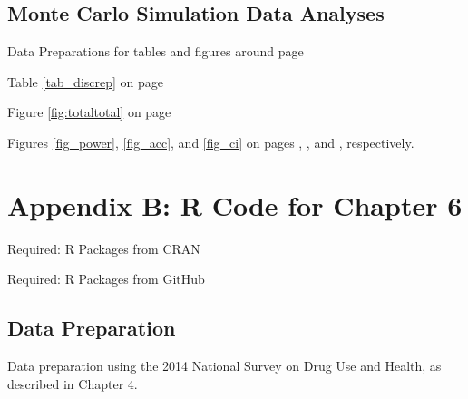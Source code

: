 \documentclass[]{DissertateUSU}
\begin{document}
\subsection*{Monte Carlo Simulation Data
Analyses}\label{monte-carlo-simulation-data-analyses}

Data Preparations for tables and figures around page
\pageref{tab_discrep}

\small

\normalsize

Table \ref{tab_discrep} on page \pageref{tab_discrep}

\small

\normalsize

Figure \ref{fig:totaltotal} on page \pageref{fig:totaltotal}

\small

\normalsize

Figures \ref{fig_power}, \ref{fig_acc}, and \ref{fig_ci} on pages
\pageref{fig_power}, \pageref{fig_acc}, and \pageref{fig_ci},
respectively.

\small

\normalsize

\clearpage

\doublespacing

\section*{Appendix B: R Code for Chapter
6}\label{appendix-b-r-code-for-chapter-6}

\singlespace

Required: R Packages from CRAN

\small

\normalsize

Required: R Packages from GitHub

\small

\normalsize

\clearpage

\subsection*{Data Preparation}\label{data-preparation}

Data preparation using the 2014 National Survey on Drug Use and Health,
as described in Chapter 4.
\end{document}
